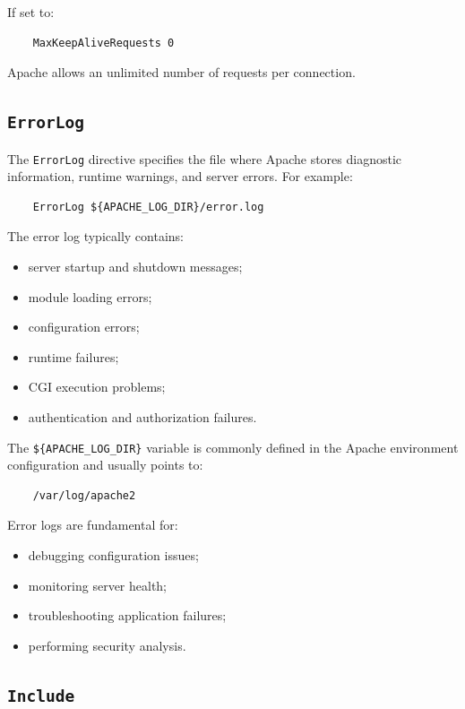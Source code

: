 \documentclass{scrbook}
\begin{document}
	If set to:
	\begin{lstlisting}
	MaxKeepAliveRequests 0
	\end{lstlisting}
	
	Apache allows an unlimited number of requests per connection.
	
	\subsection{\texttt{ErrorLog}}
	
	The \texttt{ErrorLog} directive specifies the file where Apache stores diagnostic information, runtime warnings, and server errors. For example:
	\begin{lstlisting}
	ErrorLog ${APACHE_LOG_DIR}/error.log
	\end{lstlisting}
	
	The error log typically contains:
	\begin{itemize}
		\item server startup and shutdown messages;
		\item module loading errors;
		\item configuration errors;
		\item runtime failures;
		\item CGI execution problems;
		\item authentication and authorization failures.
	\end{itemize}
	
	The \texttt{\$\{APACHE\_LOG\_DIR\}} variable is commonly defined in the Apache environment configuration and usually points to:
	
	\begin{lstlisting}
	/var/log/apache2
	\end{lstlisting}
	
	Error logs are fundamental for:
	\begin{itemize}
		\item debugging configuration issues;
		\item monitoring server health;
		\item troubleshooting application failures;
		\item performing security analysis.
	\end{itemize}
	
	\subsection{\texttt{Include}}
	
\end{document}
